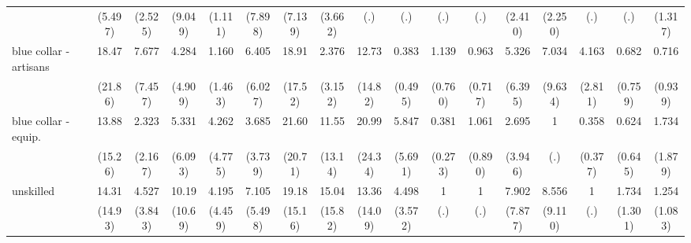 {\begin{tabular}{l*{16}{c}}
                    &     (5.497)         &     (2.525)         &     (9.049)         &     (1.111)         &     (7.898)         &     (7.139)         &     (3.662)         &         (.)         &         (.)         &         (.)         &         (.)         &     (2.410)         &     (2.250)         &         (.)         &         (.)         &     (1.317)         \\
[1em]
blue collar - artisans&       18.47\sym{*}  &       7.677\sym{*}  &       4.284         &       1.160         &       6.405\sym{*}  &       18.91\sym{**} &       2.376         &       12.73\sym{*}  &       0.383         &       1.139         &       0.963         &       5.326         &       7.034         &       4.163\sym{*}  &       0.682         &       0.716         \\
                    &     (21.86)         &     (7.457)         &     (4.909)         &     (1.463)         &     (6.027)         &     (17.52)         &     (3.152)         &     (14.82)         &     (0.495)         &     (0.760)         &     (0.717)         &     (6.395)         &     (9.634)         &     (2.811)         &     (0.759)         &     (0.939)         \\
[1em]
blue collar - equip.&       13.88\sym{*}  &       2.323         &       5.331         &       4.262         &       3.685         &       21.60\sym{**} &       11.55\sym{*}  &       20.99\sym{**} &       5.847         &       0.381         &       1.061         &       2.695         &           1         &       0.358         &       0.624         &       1.734         \\
                    &     (15.26)         &     (2.167)         &     (6.093)         &     (4.775)         &     (3.739)         &     (20.71)         &     (13.14)         &     (24.34)         &     (5.691)         &     (0.273)         &     (0.890)         &     (3.946)         &         (.)         &     (0.377)         &     (0.645)         &     (1.879)         \\
[1em]
unskilled           &       14.31\sym{*}  &       4.527         &       10.19\sym{*}  &       4.195         &       7.105\sym{*}  &       19.18\sym{***}&       15.04\sym{**} &       13.36\sym{*}  &       4.498         &           1         &           1         &       7.902\sym{*}  &       8.556\sym{*}  &           1         &       1.734         &       1.254         \\
                    &     (14.93)         &     (3.843)         &     (10.69)         &     (4.459)         &     (5.498)         &     (15.16)         &     (15.82)         &     (14.09)         &     (3.572)         &         (.)         &         (.)         &     (7.877)         &     (9.110)         &         (.)         &     (1.301)         &     (1.083)         \\

\end{tabular}}
